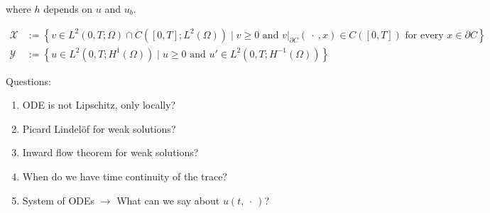 \noindent
where $h$ depends on $u$ and $u_b$.

\begin{equation*}
    \begin{aligned}
        \mathcal{X} &:= \left\{ v \in L^2(0, T; \Omega) \cap C([0, T]; L^2(\Omega)) \mid v \geq 0 \text{ and } v \vert_{\partial C}(\ \cdot\ , x) \in C([0, T]) \text{ for every } x \in \partial C \right\} \\
        \mathcal{Y} &:= \left\{ u \in L^2(0, T; H^1(\Omega)) \mid u \geq 0 \text{ and } u' \in L^2(0, T; H^{-1}(\Omega)) \right\}
    \end{aligned}
\end{equation*}

\noindent
Questions:

\begin{enumerate}
    \item ODE is not Lipschitz, only locally?
    \item Picard Lindel\"of for weak solutions?
    \item Inward flow theorem for weak solutions?
    \item When do we have time continuity of the trace?
    \item System of ODEs $\rightarrow$ What can we say about $u(t,\ \cdot\ )$?
\end{enumerate}